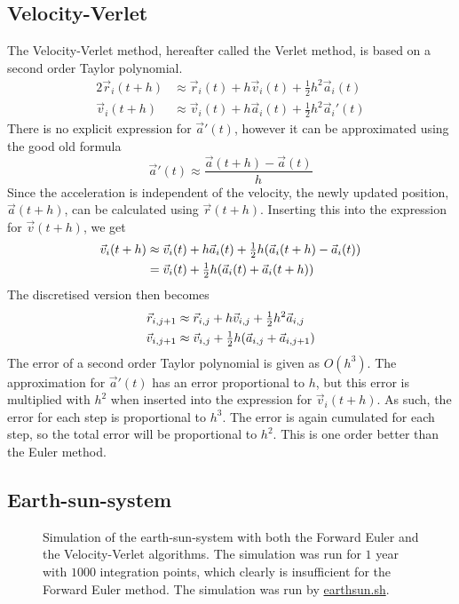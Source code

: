 \documentclass[12pt,english,a4paper]{report}
\newcommand{\program}[1]{\href{https://github.com/anjohan/Offentlig/blob/master/FYS3150/Oblig3/#1}{#1}}
\begin{document}
\subsection{Velocity-Verlet}
The Velocity-Verlet method, hereafter called the Verlet method, is based on a second order Taylor polynomial.
\begin{alignat*}{2}
\vec{r}_i(t+h) &\approx \vec{r}_i(t) + h\vec{v}_i(t) + \tfrac{1}{2}h^2\vec{a}_i(t)\\
\vec{v}_i(t+h) &\approx \vec{v}_i(t) + h\vec{a}_i(t) + \tfrac{1}{2}h^2\vec{a}_i'(t)
\end{alignat*}
There is no explicit expression for \(\vec{a}'(t)\), however it can be approximated using the good old formula
\[
\vec{a}'(t)\approx\frac{\vec{a}(t+h)-\vec{a}(t)}{h}
\]
Since the acceleration is independent of the velocity, the newly updated position, \(\vec{a}(t+h)\), can be calculated using \(\vec{r}(t+h)\). Inserting this into the expression for \(\vec{v}(t+h)\), we get
\begin{alignat*}{2}
\vec{v}_i(t+h) &\approx \vec{v}_i(t) + h\vec{a}_i(t) + \tfrac{1}{2}h\qty(\vec{a}_i(t+h)-\vec{a}_i(t))\\
&= \vec{v}_i(t) + \tfrac{1}{2}h\qty(\vec{a}_i(t)+\vec{a}_i(t+h))
\end{alignat*}
The discretised version then becomes
\begin{alignat*}{2}
\vec{r}_{i,j+1} &\approx \vec{r}_{i,j} + h\vec{v}_{i,j} + \tfrac{1}{2}h^2\vec{a}_{i,j}\\
\vec{v}_{i,j+1} &\approx \vec{v}_{i,j} + \tfrac{1}{2}h\qty(\vec{a}_{i,j} + \vec{a}_{i,j+1})
\end{alignat*}
The error of a second order Taylor polynomial is given as \(O(h^3)\). The approximation for \(\vec{a}'(t)\) has an error proportional to \(h\), but this error is multiplied with \(h^2\) when inserted into the expression for \(\vec{v}_i(t+h)\). As such, the error for each step is proportional to \(h^3\). The error is again cumulated for each step, so the total error will be proportional to \(h^2\). This is one order better than the Euler method.





\subsection{Earth-sun-system}
\begin{figure}[H]
\centering

\caption{Simulation of the earth-sun-system with both the Forward Euler and the Velocity-Verlet algorithms. The simulation was run for \(1\) year with \(\num{1000}\) integration points, which clearly is insufficient for the Forward Euler method. The simulation was run by \program{earthsun.sh}.}
\end{figure}
\end{document}
